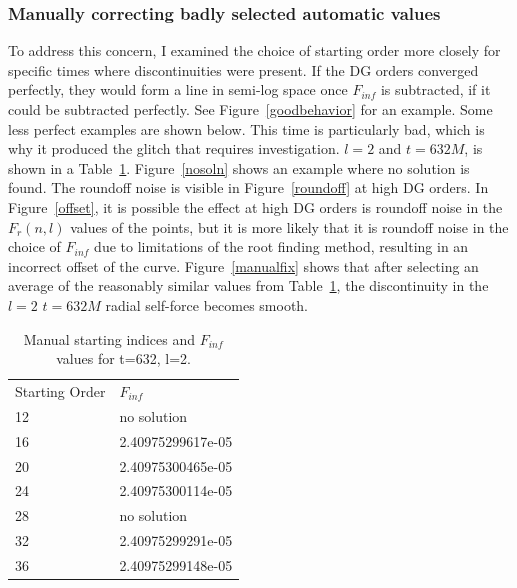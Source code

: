 \subsubsection{Manually correcting badly selected automatic values}
To address this concern, I examined the choice of starting order more closely for specific times where discontinuities were present. If the DG orders converged perfectly, they would form a line in semi-log space once $F_{inf}$ is subtracted, if it could be subtracted perfectly. See Figure~\ref{goodbehavior} for an example. Some less perfect examples are shown below. This time is particularly bad, which is why it produced the glitch that requires investigation. $l=2$ and $t=632M$, is shown in a Table~\ref{manual}. Figure~\ref{nosoln} shows an example where no solution is found. The roundoff noise is visible in Figure~\ref{roundoff} at high DG orders. In Figure~\ref{offset}, it is possible the effect at high DG orders is roundoff noise in the $F_r(n,l)$ values of the points, but it is more likely that it is roundoff noise in the choice of $F_{inf}$ due to limitations of the root finding method, resulting in an incorrect offset of the curve. Figure~\ref{manualfix} shows that after selecting an average of the reasonably similar values from Table~\ref{manual}, the discontinuity in the $l=2$ $t=632M$ radial self-force becomes smooth. 


\begin{table}
  \begin{tabular}{ll}
    Starting Order & $F_{inf}$\\
    12 & no solution\\
    16 & 2.40975299617e-05\\
    20 & 2.40975300465e-05\\
    24 & 2.40975300114e-05\\
    28 & no solution\\
    32 & 2.40975299291e-05\\
    36 & 2.40975299148e-05\\
  \end{tabular}
  \caption{Manual starting indices and $F_{inf}$ values for t=632, l=2.}
  \label{manual}
\end{table}

